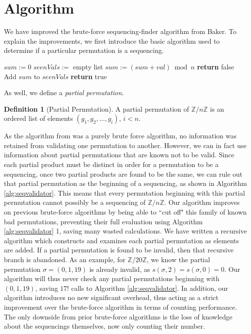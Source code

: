 \documentclass[12pt]{article}
\theoremstyle{plain}
\theoremstyle{definition}
\newtheorem{definition}{Definition}
\theoremstyle{remark}
\newcommand{\ZZ}{\mathbb{Z}}
\newcommand{\partialsum}[2]{s(#1,#2)}
\begin{document}
\section{Algorithm}\label{sec:algo} 
We have improved the brute-force sequencing-finder algorithm from Baker\cite{Baker}. To explain the improvements, we first introduce the basic algorithm used to determine if a particular permutation is a sequencing. 
\begin{algorithm}[H]
\caption{Sequencing Validator}\label{alg:seqvalidator}
\begin{algorithmic}[1]
\State $sum := 0$
\State $seenVals := $ empty list
\State $sum := (sum + val) \bmod{n}$
\State \textbf{return} false
\EndIf
\State Add $sum$ to $seenVals$
\EndFor
\State \textbf{return} true
\EndProcedure
\end{algorithmic}
\end{algorithm}

As well, we define a \textit{partial permutation}.
\begin{definition}[Partial Permutation]\label{def:partialperm}
    A partial permutation of $\ZZ/n\ZZ$ is an ordered list of elements $(g_1, g_2, \ldots, g_i)$, $i<n$.
\end{definition}
As the algorithm from \cite{Baker} was a purely brute force algorithm, no information was retained from validating one permutation to another. However, we can in fact use information about partial permutations that are known not to be valid. Since each partial product must be distinct in order for a permutation to be a sequencing, once two partial products are found to be the same, we can rule out that partial permutation as the beginning of a sequencing, as shown in Algorithm \ref{alg:seqvalidator}. This means that every permutation beginning with this partial permutation cannot possibly be a sequencing of $\ZZ/n\ZZ$. Our algorithm improves on previous brute-force algorithms by being able to ``cut off" this family of known bad permutations, preventing their full evaluation using Algorithm \ref{alg:seqvalidator} 1, saving many wasted calculations. We have written a recursive algorithm which constructs and examines each partial permutation as elements are added. If a partial permutation is found to be invalid, then that recursive branch is abandoned. As an example, for $\ZZ / 20\ZZ$, we know the partial permutation $\sigma=(0, 1, 19)$ is already invalid, as $\partialsum{\sigma}{2} = \partialsum{\sigma}{0} = 0$. Our algorithm will thus never check any partial permutations beginning with $(0, 1, 19)$, saving $17!$ calls to Algorithm \ref{alg:seqvalidator}. In addition, our algorithm introduces no new significant overhead, thus acting as a strict improvement over the brute-force algorithm in terms of counting performance. The only downside from prior brute-force algorithms is the loss of knowledge about the sequencings themselves, now only counting their number. 
\end{document}
